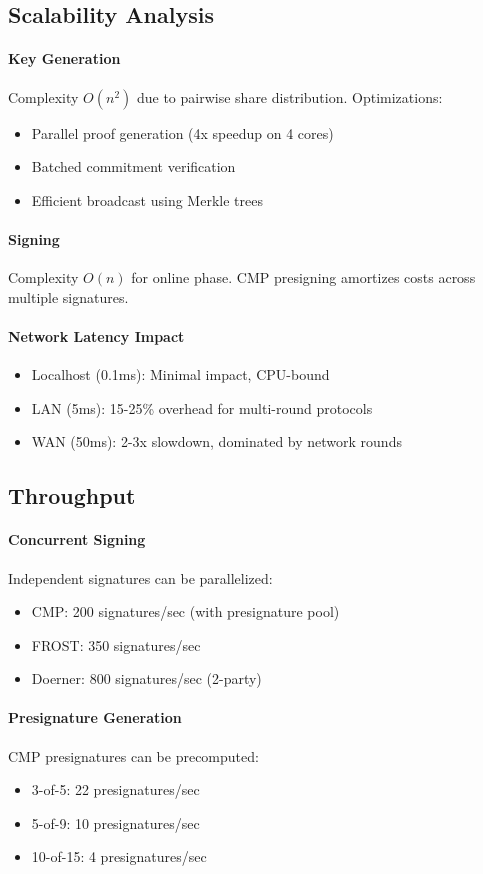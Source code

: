 \subsection{Scalability Analysis}

\paragraph{Key Generation} Complexity $O(n^2)$ due to pairwise share distribution. Optimizations:
\begin{itemize}
\item Parallel proof generation (4x speedup on 4 cores)
\item Batched commitment verification
\item Efficient broadcast using Merkle trees
\end{itemize}

\paragraph{Signing} Complexity $O(n)$ for online phase. CMP presigning amortizes costs across multiple signatures.

\paragraph{Network Latency Impact}
\begin{itemize}
\item Localhost (0.1ms): Minimal impact, CPU-bound
\item LAN (5ms): 15-25\% overhead for multi-round protocols
\item WAN (50ms): 2-3x slowdown, dominated by network rounds
\end{itemize}

\subsection{Throughput}

\paragraph{Concurrent Signing} Independent signatures can be parallelized:
\begin{itemize}
\item CMP: 200 signatures/sec (with presignature pool)
\item FROST: 350 signatures/sec
\item Doerner: 800 signatures/sec (2-party)
\end{itemize}

\paragraph{Presignature Generation} CMP presignatures can be precomputed:
\begin{itemize}
\item 3-of-5: 22 presignatures/sec
\item 5-of-9: 10 presignatures/sec
\item 10-of-15: 4 presignatures/sec
\end{itemize}

